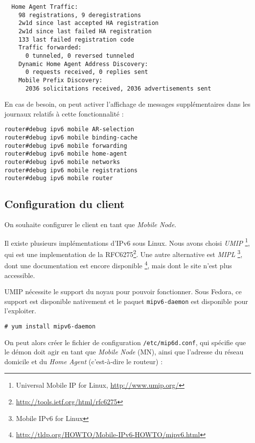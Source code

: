 \begin{itemize}
\begin{lstlisting}
  Home Agent Traffic:
    98 registrations, 9 deregistrations
    2w1d since last accepted HA registration
    2w1d since last failed HA registration
    133 last failed registration code
    Traffic forwarded:
      0 tunneled, 0 reversed tunneled
    Dynamic Home Agent Address Discovery:
      0 requests received, 0 replies sent
    Mobile Prefix Discovery:
      2036 solicitations received, 2036 advertisements sent\end{lstlisting}
\end{itemize}

En cas de besoin, on peut activer l'affichage de messages supplémentaires dans les journaux relatifs à cette fonctionnalité :

\begin{lstlisting}
router#debug ipv6 mobile AR-selection
router#debug ipv6 mobile binding-cache
router#debug ipv6 mobile forwarding 
router#debug ipv6 mobile home-agent   
router#debug ipv6 mobile networks    
router#debug ipv6 mobile registrations      
router#debug ipv6 mobile router 
\end{lstlisting}

\subsection{Configuration du client}

On souhaite configurer le client en tant que \emph{Mobile Node}.

Il existe plusieurs implémentations d'IPv6 sous Linux.
Nous avons choisi \emph{UMIP} \footnote{Universal Mobile IP for Linux, \url{http://www.umip.org/}}, qui est une implementation de la RFC6275\footnote{\url{http://tools.ietf.org/html/rfc6275}}.
Une autre alternative est \emph{MIPL} \footnote{Mobile IPv6 for Linux}, dont une documentation est encore disponible \footnote{\url{http://tldp.org/HOWTO/Mobile-IPv6-HOWTO/mipv6.html}}, mais dont le site n'est plus accessible.

UMIP nécessite le support du noyau pour pouvoir fonctionner. Sous Fedora, ce support est disponible nativement et le paquet \texttt{mipv6-daemon} est disponible pour l'exploiter.

\begin{lstlisting}
# yum install mipv6-daemon
\end{lstlisting}

On peut alors créer le fichier de configuration \texttt{/etc/mip6d.conf}, qui spécifie que le démon doit agir en tant que \emph{Mobile Node} (MN), ainsi que l'adresse du réseau domicile et du \emph{Home Agent} (c'est-à-dire le routeur) :

